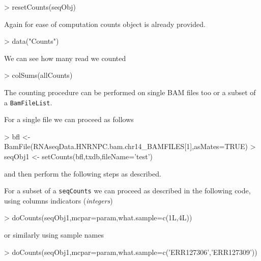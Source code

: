 \documentclass[10pt]{article}
\newcommand{\Robject}[1]{{\texttt{#1}}}
\begin{document}
\begin{Schunk}
\begin{Sinput}
> resetCounts(seqObj)
\end{Sinput}
\end{Schunk}



Again for ease of computation counts object is already provided.

\begin{Schunk}
\begin{Sinput}
> data("Counts")
\end{Sinput}
\end{Schunk}

We can see how many read we counted

\begin{Schunk}
\begin{Sinput}
> colSums(allCounts)
\end{Sinput}
\end{Schunk}



The counting procedure can be performed on single BAM files too or a subset of a \Robject{BamFileList}.

For a single file we can proceed as follows

\begin{Schunk}
\begin{Sinput}
> bfl <- BamFile(RNAseqData.HNRNPC.bam.chr14_BAMFILES[1],asMates=TRUE)
> seqObj1 <- setCounts(bfl,txdb,fileName='test')
\end{Sinput}
\end{Schunk}

and then perform the following steps as described.

For a subset of a \Robject{seqCounts} we can proceed as described in the
following code, using columns indicators (\textit{integers})

\begin{Schunk}
\begin{Sinput}
> doCounts(seqObj1,mcpar=param,what.sample=c(1L,4L))
\end{Sinput}
\end{Schunk}

or similarly using sample names

\begin{Schunk}
\begin{Sinput}
> doCounts(seqObj1,mcpar=param,what.sample=c('ERR127306','ERR127309'))
\end{Sinput}
\end{Schunk}
\end{document}
